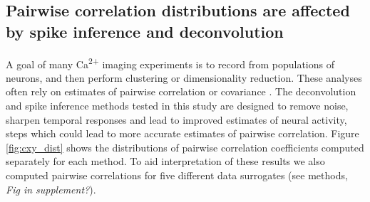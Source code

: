 \documentclass[a4paper,10pt,twocolumn]{article}
\begin{document}


\subsection{Pairwise correlation distributions are affected by spike inference and deconvolution}



A goal of many Ca\textsuperscript{2+} imaging experiments is to record from populations of neurons, and then perform clustering or dimensionality reduction. These analyses often rely on estimates of pairwise correlation or covariance \citep{Okun2015-ml,Cunningham2014-vd}. The deconvolution and spike inference methods tested in this study are designed to remove noise, sharpen temporal responses and lead to improved estimates of neural activity, steps which could lead to more accurate estimates of pairwise correlation. Figure \ref{fig:cxy_dist} shows the distributions of pairwise correlation coefficients computed separately for each method. To aid interpretation of these results we also computed pairwise correlations for five different data surrogates (see methods, \emph{Fig in supplement?}).
\end{document}
